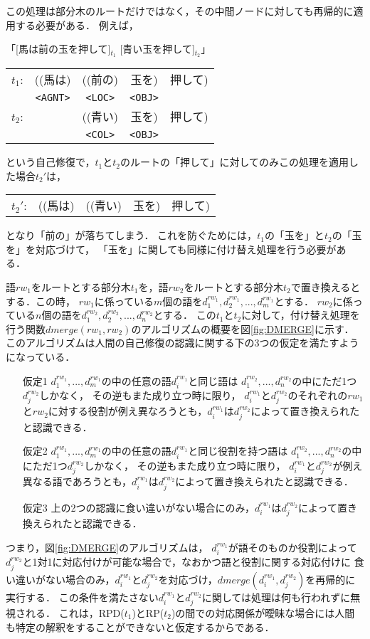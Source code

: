 この処理は部分木のルートだけではなく，その中間ノードに対しても再帰的に適用する必要がある．
例えば，
\begin{center}
\begin{mbox}
「[馬は前の玉を押して]$_{t_1}$ [青い玉を押して]$_{t_2}$」\\
\begin{tabular}{lcccc}
$t_1$:& ((馬は) & ((前の) & 玉を) & 押して)\\
      &\verb+<AGNT>+&\verb+<LOC>+&\verb+<OBJ>+&\\
$t_2$:&         & ((青い) & 玉を) & 押して)\\
      &      &\verb+<COL>+&\verb+<OBJ>+&\\
\end{tabular}
\end{mbox}
\end{center}
という自己修復で，$t_1$と$t_2$のルートの「押して」に対してのみこの処理を適用した場合$t_2'$は，
\begin{center}
\begin{tabular}{lcccc}
$t_2'$:& ((馬は) & ((青い) & 玉を) & 押して)
\end{tabular}
\end{center}
となり「前の」が落ちてしまう．
これを防ぐためには，$t_1$の「玉を」と$t_2$の「玉を」を対応づけて，
「玉を」に関しても同様に付け替え処理を行う必要がある．


語$rw_1$をルートとする部分木$t_1$を，語$rw_2$をルートとする部分木$t_2$で置き換えるとする．この時，
$rw_1$に係っている$m$個の語を$d_1^{rw_1}, d_2^{rw_1}, ... , d_m^{rw_1}$とする．
$rw_2$に係っている$n$個の語を$d_1^{rw_2}, d_2^{rw_2}, ... , d_n^{rw_2}$とする．
この$t_1$と$t_2$に対して，付け替え処理を行う関数$dmerge(rw_1, rw_2)$のアルゴリズムの概要を図\ref{fig:DMERGE}に示す．
このアルゴリズムは人間の自己修復の認識に関する下の3つの仮定を満たすようになっている．
\begin{itemize}
\item[仮定1] $d_1^{rw_1}, ... ,d_m^{rw_1}$の中の任意の語$d_i^{rw_1}$と同じ語は
$d_1^{rw_2}, ... ,d_n^{rw_2}$の中にただ1つ$d_j^{rw_2}$しかなく，
その逆もまた成り立つ時に限り，
$d_i^{rw_1}$と$d_j^{rw_2}$のそれぞれの$rw_1$と$rw_2$に対する役割が例え異なろうとも，$d_i^{rw_1}$は$d_j^{rw_2}$によって置き換えられたと認識できる．
\item[仮定2] $d_1^{rw_1}, ... ,d_m^{rw_1}$の中の任意の語$d_i^{rw_1}$と同じ役割を持つ語は
$d_1^{rw_2}, ... ,d_n^{rw_2}$の中にただ1つ$d_j^{rw_2}$しかなく，
その逆もまた成り立つ時に限り，
$d_i^{rw_1}$と$d_j^{rw_2}$が例え異なる語であろうとも，$d_i^{rw_1}$は$d_j^{rw_2}$によって置き換えられたと認識できる．
\item[仮定3] 上の2つの認識に食い違いがない場合にのみ，$d_i^{rw_1}$は$d_j^{rw_2}$によって置き換えられたと認識できる．
\end{itemize}
つまり，図\ref{fig:DMERGE}のアルゴリズムは，
$d_i^{rw_1}$が語そのものか役割によって$d_j^{rw_2}$と1対1に対応付けが可能な場合で，なおかつ語と役割に関する対応付けに
食い違いがない場合のみ，$d_i^{rw_1}$と$d_j^{rw_2}$を対応づけ，$dmerge(d_i^{rw_1},d_j^{rw_2})$を再帰的に実行する．
この条件を満たさない$d_i^{rw_1}$と$d_j^{rw_2}$に関しては処理は何も行われずに無視される．
これは，RPD($t_1$)とRP($t_2$)の間での対応関係が曖昧な場合には人間も特定の解釈をすることができないと仮定するからである．

